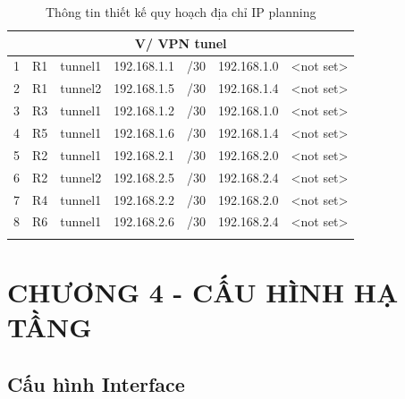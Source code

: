 \documentclass[12pt,a4paper]{report}
\begin{document}
\begin{center}
\begin{longtable}{|p{}|p{}|p{}|p{}|p{}|p{}|p{}|}
	
\hline  \multicolumn{7}{|c|}{V/ VPN tunel} \\	                          
\hline  1  &  R1  &  tunnel1  &  192.168.1.1  &  /30  &  192.168.1.0  &  <not set> \\
\hline  2  &  R1  &  tunnel2  &  192.168.1.5  &  /30  &  192.168.1.4  &  <not set> \\
\hline  3  &  R3  &  tunnel1  &  192.168.1.2  &  /30  &  192.168.1.0  &  <not set> \\
\hline  4  &  R5  &  tunnel1  &  192.168.1.6  &  /30  &  192.168.1.4  &  <not set> \\
\hline  5  &  R2  &  tunnel1  &  192.168.2.1  &  /30  &  192.168.2.0  &  <not set> \\
\hline  6  &  R2  &  tunnel2  &  192.168.2.5  &  /30  &  192.168.2.4  &  <not set> \\
\hline  7  &  R4  &  tunnel1  &  192.168.2.2  &  /30  &  192.168.2.0  &  <not set> \\
\hline  8  &  R6  &  tunnel1  &  192.168.2.6  &  /30  &  192.168.2.4  &  <not set> \\
        \hline
        \caption{Thông tin thiết kế quy hoạch địa chỉ IP planning}
        \label{hinh33a }
    \end{longtable}
    
    \end{center}
\newpage
\section*{CHƯƠNG 4 - CẤU HÌNH HẠ TẦNG}
\setcounter{section}{4}
\setcounter{subsection}{0}
\setcounter{figure}{0}
\setcounter{table}{0}
\subsection{Cấu hình Interface}
\end{document}
